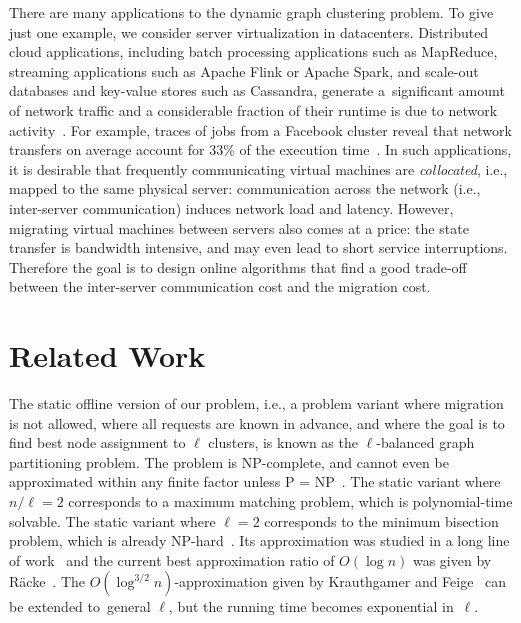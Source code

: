 \documentclass{siamart190516}
\begin{document}
There are many applications to the dynamic graph clustering problem.
To give just one example, we consider server virtualization in
datacenters. Distributed cloud applications, including batch processing
applications such as MapReduce, streaming applications such as Apache Flink or
Apache Spark, and scale-out databases and key-value stores such as Cassandra,
generate a~significant amount of network traffic and a considerable fraction
of their runtime is due to network activity~\cite{MogPop12}. For example,
traces of jobs from a Facebook cluster reveal that network transfers on
average account for 33\% of the execution time~\cite{ChZMJS11}. In such
applications, it is desirable that frequently communicating virtual machines
are \emph{collocated}, i.e., mapped to the same physical server: 
communication across the network (i.e., inter-server communication) induces
network load and latency. However, migrating virtual machines between servers
also comes at a price: the state transfer is bandwidth intensive, and may even
lead to short service interruptions. Therefore the goal is to design online
algorithms that find a good trade-off between the inter-server communication
cost and the migration cost.




\section{Related Work}\label{sec:relwork}

The static offline version of our problem, i.e., a problem variant where
migration is not allowed, where all requests are known in advance, and where
the goal is to find best node assignment to $\ell$ clusters, is known as the
$\ell$-balanced graph partitioning problem. The problem is 
NP-complete, and cannot even be approximated within any finite factor unless P
= NP~\cite{AndRae06}. The static variant where $n/\ell = 2$ corresponds to a
maximum matching problem, which is polynomial-time solvable. The static
variant where $\ell = 2$ corresponds to the minimum bisection problem, which
is already NP-hard~\cite{GaJoSt76}. Its approximation was studied in a long
line of work~\cite{SarVaz95,ArKaKa99,FeKrNi00,FeiKra02,KraFei06,Raec08} and
the current best approximation ratio of $O(\log n)$ was given by
R{\"{a}}cke~\cite{Raec08}. The $O(\log^{3/2} n)$-approximation given by
Krauthgamer and Feige~\cite{KraFei06} can be extended to~general $\ell$, but
the running time becomes exponential in~$\ell$.
\end{document}
